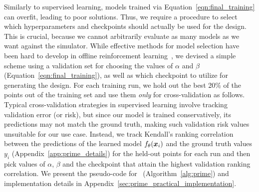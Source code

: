  Similarly to supervised learning, models trained via Equation~\ref{eqn:final_training} can overfit, leading to poor solutions. Thus, we require a procedure to select which hyperparameters and checkpoints should actually be used for the design. This is crucial, because we cannot arbitrarily evaluate as many models as we want against the simulator. While effective methods for model selection have been hard to develop in offline reinforcement learning~\citep{trabucco2021conservative,trabucco2021designbench}, we devised a simple scheme using a validation set for choosing the values of $\alpha$ and $\beta$ (Equation~\ref{eqn:final_training}), as well as which checkpoint to utilize for generating the design. For each training run, we hold out the best 20\% of the points out of the training set and use them \textit{only} for cross-validation as follows. Typical cross-validation strategies in supervised learning involve tracking validation error (or risk), but since our model is trained conservatively, its predictions may not match the ground truth, making such validation risk values unsuitable for our use case. Instead, we track Kendall's ranking correlation between the predictions of the learned model $f_\theta({\boldsymbol{x}}_i)$ and the ground truth values $y_i$ (Appendix~\ref{app:prime_details}) for the held-out points for each run and then pick values of $\alpha$, $\beta$ and the checkpoint that attain the highest validation ranking correlation.
We present the pseudo-code for \primemethodname\ (Algorithm~\ref{alg:prime}) and implementation details in Appendix~\ref{sec:prime_practical_implementation}.